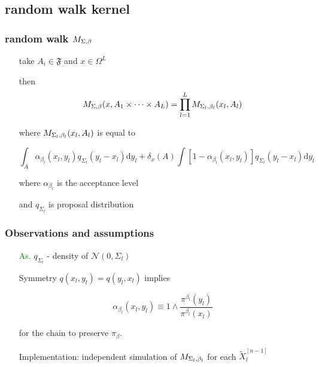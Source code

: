 		\subsection{random walk kernel}

\begin{frame}
		\frametitle{ random walk $M_{\Sigma,\beta}$ }

	\begin{itemize}
		\item[] take $A_i \in \mathfrak{F}$ and $x \in \Omega^L$
		\item[] then
  $$M_{\Sigma,\beta} (x, A_1 \times \dots \times A_L) = \prod_{l=1}^L M_{\Sigma_{l},\beta_{l}}(x_l, A_l)$$
		
		\item[] where $M_{\Sigma_{l},\beta_{l}}(x_l, A_l)$ is equal to  
		\item[] 
$$\int_A \alpha_{\beta_l} (x_l, y_l) q_{\Sigma_l} (y_l - x_l) \mathrm{d }y_l + \delta_x (A) \int [1 - \alpha_{\beta_l} (x_l, y_l)] q_{\Sigma_l} (y_l - x_l) \mathrm{d }y_l$$

		\item[] where $\alpha_{\beta_l}$ is the acceptance level 
		\item[] and $q_{\Sigma_l}$ is proposal distribution 
	\end{itemize}

\end{frame}

\begin{frame}
		\frametitle{ Observations and assumptions }

	\begin{itemize}
		\item[\textcolor{green}{As.}] $q_{\Sigma_l}$ - density of $\mathcal{N}(0, \Sigma_l)$
		\item[]
		\item[] Symmetry $q(x_l,y_l) = q(y_l,x_l)$ implies 
		\item[]	$$ \alpha_{\beta_l} (x_l, y_l)  \equiv 1 \wedge \frac{\pi^{\beta_l}(y_l)}{\pi^{\beta_l}(x_l)} $$
		\item[] for the chain to preserve $\pi_\beta$.
		\item[] 
		\item[] Implementation: independent simulation of $M_{\Sigma_{l},\beta_{l}}$ for each $\widetilde{X}^{[n-1]}_l$
		
	\end{itemize}

\end{frame}

